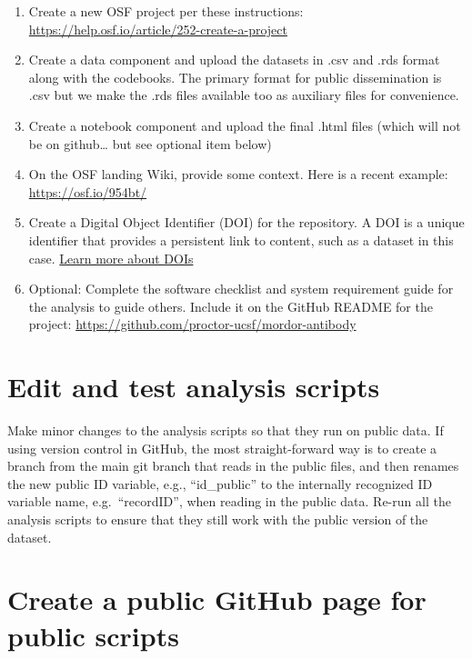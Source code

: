 \documentclass[
]{book}
\providecommand{\tightlist}{%
  \setlength{\itemsep}{0pt}\setlength{\parskip}{0pt}}
\begin{document}
\begin{enumerate}
\def\labelenumi{\arabic{enumi}.}
\tightlist
\item
  Create a new OSF project per these instructions: \url{https://help.osf.io/article/252-create-a-project}
\item
  Create a data component and upload the datasets in .csv and .rds format along with the codebooks. The primary format for public dissemination is .csv but we make the .rds files available too as auxiliary files for convenience.
\item
  Create a notebook component and upload the final .html files (which will not be on github\ldots{} but see optional item below)
\item
  On the OSF landing Wiki, provide some context. Here is a recent example: \url{https://osf.io/954bt/}
\item
  Create a Digital Object Identifier (DOI) for the repository. A DOI is a unique identifier that provides a persistent link to content, such as a dataset in this case. \href{https://researchdata.princeton.edu/research-lifecycle-guide/whats-doi-and-what-should-i-know-about-citing-datasets}{Learn more about DOIs}
\item
  Optional: Complete the software checklist and system requirement guide for the analysis to guide others. Include it on the GitHub README for the project: \url{https://github.com/proctor-ucsf/mordor-antibody}
\end{enumerate}

\section{Edit and test analysis scripts}\label{edit-and-test-analysis-scripts}

Make minor changes to the analysis scripts so that they run on public data. If using version control in GitHub, the most straight-forward way is to create a branch from the main git branch that reads in the public files, and then renames the new public ID variable, e.g., ``id\_public'' to the internally recognized ID variable name, e.g.~``recordID'', when reading in the public data. Re-run all the analysis scripts to ensure that they still work with the public version of the dataset.

\section{Create a public GitHub page for public scripts}\label{create-a-public-github-page-for-public-scripts}
\end{document}
